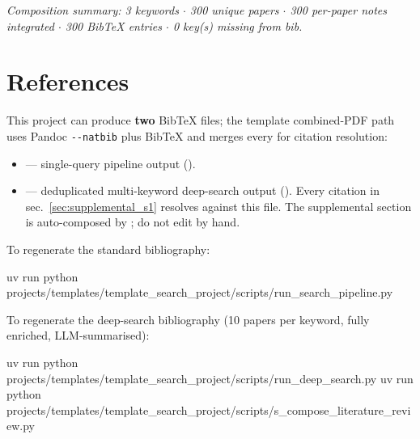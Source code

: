 \documentclass[
  english,
]{article}
\newenvironment{Shaded}{}{}
\newcommand{\ExtensionTok}[1]{#1}
\newcommand{\NormalTok}[1]{#1}
\providecommand{\tightlist}{%
  \setlength{\itemsep}{0pt}\setlength{\parskip}{0pt}}
\begin{document}
\emph{Composition summary: 3 keywords \texorpdfstring{\ensuremath{\cdot}}{.} 300 unique papers \texorpdfstring{\ensuremath{\cdot}}{.} 300
per-paper notes integrated \texorpdfstring{\ensuremath{\cdot}}{.} 300 BibTeX entries \texorpdfstring{\ensuremath{\cdot}}{.} 0 key(s) missing from
bib.}

\newpage

\section{References}\label{sec:references}

This project can produce \textbf{two} BibTeX files; the template
combined-PDF path uses Pandoc \texttt{-\/-natbib} plus BibTeX and merges
every  for citation resolution:

\begin{itemize}
\tightlist
\item
  \href{references.bib}{} ---
  single-query pipeline output
  ().
\item
  \href{references_deep.bib}{}
  --- deduplicated multi-keyword deep-search output
  (). Every citation in
  sec.~\ref{sec:supplemental_s1} resolves against this file. The
  supplemental section is auto-composed by
  ; do not edit by
  hand.
\end{itemize}

To regenerate the standard bibliography:

\begin{Shaded}
\begin{Highlighting}[]
\ExtensionTok{uv}\NormalTok{ run python projects/templates/template\_search\_project/scripts/run\_search\_pipeline.py}
\end{Highlighting}
\end{Shaded}

To regenerate the deep-search bibliography (10 papers per keyword, fully
enriched, LLM-summarised):

\begin{Shaded}
\begin{Highlighting}[]
\ExtensionTok{uv}\NormalTok{ run python projects/templates/template\_search\_project/scripts/run\_deep\_search.py}
\ExtensionTok{uv}\NormalTok{ run python projects/templates/template\_search\_project/scripts/s\_compose\_literature\_review.py}
\end{Highlighting}
\end{Shaded}
\end{document}
